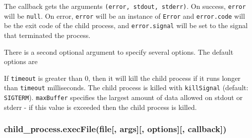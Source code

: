 The callback gets the arguments \texttt{(error,\ stdout,\ stderr)}. On
success, \texttt{error} will be \texttt{null}. On error, \texttt{error}
will be an instance of \texttt{Error} and \texttt{error.code} will be
the exit code of the child process, and \texttt{error.signal} will be
set to the signal that terminated the process.

There is a second optional argument to specify several options. The
default options are

\begin{Shaded}
\begin{Highlighting}[]
\NormalTok{\{ }\NormalTok{: }\NormalTok{,}
  \NormalTok{: }\NormalTok{,}
  \NormalTok{: }\NormalTok{*}\NormalTok{,}
  \NormalTok{: }\NormalTok{,}
  \NormalTok{: }\NormalTok{,}
  \NormalTok{: } \NormalTok{\}}
\end{Highlighting}
\end{Shaded}

If \texttt{timeout} is greater than 0, then it will kill the child
process if it runs longer than \texttt{timeout} milliseconds. The child
process is killed with \texttt{killSignal} (default:
\texttt{\textquotesingle{}SIGTERM\textquotesingle{}}).
\texttt{maxBuffer} specifies the largest amount of data allowed on
stdout or stderr - if this value is exceeded then the child process is
killed.

\subsubsection{child\_process.execFile(file{[}, args{]}{[},
options{]}{[},
callback{]})}\label{childux5fprocess.execfilefile-args-options-callback}

